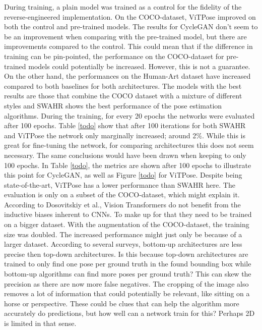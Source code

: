 During training, a plain model was trained as a control for the fidelity of the reverse-engineered implementation.
On the COCO-dataset, ViTPose improved on both the control and pre-trained models.
The results for CycleGAN don't seem to be an improvement when comparing with the pre-trained model, but there are improvements compared to the control.
This could mean that if the difference in training can be pin-pointed, the performance on the COCO-dataset for pre-trained models could potentially be increased.
However, this is not a guarantee.
On the other hand, the performances on the Human-Art dataset have increased compared to both baselines for both architectures.
The models with the best results are those that combine the COCO dataset with a mixture of different styles and SWAHR shows the best performance of the pose estimation algorithms.
During the training, for every 20 epochs the networks were evaluated after 100 epochs.
Table \ref{todo} show that after 100 iterations for both SWAHR and ViTPose the network only marginally increased; around 2\%.
While this is great for fine-tuning the network, for comparing architectures this does not seem necessary.
The same conclusions would have been drawn when keeping to only 100 epochs.
In Table \ref{todo}, the metrics are shown after 100 epochs to illustrate this point for CycleGAN, as well as Figure \ref{todo} for ViTPose.
Despite being state-of-the-art, ViTPose has a lower performance than SWAHR here.
The evaluation is only on a subset of the COCO-dataset, which might explain it.
According to Dosovitskiy et al., \cite{Dosovitskiy2020} Vision Transformers do not benefit from the inductive biases inherent to CNNs.
To make up for that they need to be trained on a bigger dataset.
With the augmentation of the COCO-dataset, the training size was doubled.
The increased performance might just only be because of a larger dataset.
According to several surveys, bottom-up architectures are less precise then top-down architectures.
Is this because top-down architectures are trained to only find one pose per ground truth in the found bounding box while bottom-up algorithms can find more poses per ground truth?
This can skew the precision as there are now more false negatives.
The cropping of the image also removes a lot of information that could potentially be relevant, like sitting on a horse or perspective.
These could be clues that can help the algorithm more accurately do predictions, but how well can a network train for this? Perhaps 2D is limited in that sense.

